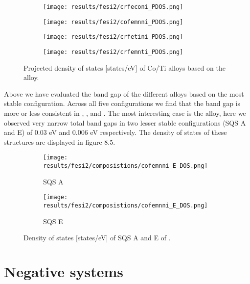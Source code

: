 \begin{figure}[H]
\begin{subfigure}{.5\textwidth}
\texttt{[image: results/fesi2/crfeconi\_PDOS.png]}
\caption{}
\end{subfigure}
\begin{subfigure}{.5\textwidth}
\texttt{[image: results/fesi2/cofemnni\_PDOS.png]}
\caption{}
\end{subfigure}
\begin{subfigure}{.5\textwidth}
\texttt{[image: results/fesi2/crfetini\_PDOS.png]}
\caption{}
\end{subfigure}
\begin{subfigure}{.5\textwidth}
\texttt{[image: results/fesi2/crfemnti\_PDOS.png]}
\caption{}
\end{subfigure}
\caption{Projected density of states [states/eV] of Co/Ti alloys based on the  alloy.}
\end{figure}

Above we have evaluated the band gap of the different alloys based on the most stable configuration. Across all five configurations we find that the band gap is more or less consistent in ,  ,  and .  The most interesting case is the  alloy, here we observed very narrow total band gaps in two lesser stable configurations (SQS A and E) of 0.03 eV and 0.006 eV respectively. The density of states of these structures are displayed in figure 8.5.

\begin{figure}[H]
\begin{subfigure}{.5\textwidth}
\texttt{[image: results/fesi2/composistions/cofemnni\_E\_DOS.png]}
\caption{SQS A}
\end{subfigure}
\begin{subfigure}{.5\textwidth}
\texttt{[image: results/fesi2/composistions/cofemnni\_E\_DOS.png]}
\caption{SQS E}
\end{subfigure}
\caption{Density of states [states/eV] of SQS A and E of .}
\end{figure} 

\section{Negative systems}

